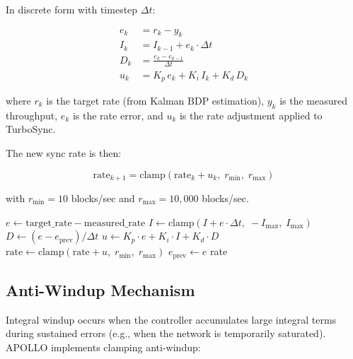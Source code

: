 \documentclass[11pt,a4paper]{article}
\begin{document}
In discrete form with timestep $\Delta t$:

\begin{align}
e_k &= r_k - y_k \label{eq:error} \\
I_k &= I_{k-1} + e_k \cdot \Delta t \label{eq:integral} \\
D_k &= \frac{e_k - e_{k-1}}{\Delta t} \label{eq:derivative} \\
u_k &= K_p \, e_k + K_i \, I_k + K_d \, D_k \label{eq:pid_discrete}
\end{align}

where $r_k$ is the target rate (from Kalman BDP estimation), $y_k$ is the measured throughput, $e_k$ is the rate error, and $u_k$ is the rate adjustment applied to TurboSync.

The new sync rate is then:

\begin{equation}
\text{rate}_{k+1} = \text{clamp}\!\left(\text{rate}_k + u_k,\; r_{\min},\; r_{\max}\right)
\label{eq:rate_update}
\end{equation}

with $r_{\min} = 10$ blocks/sec and $r_{\max} = 10{,}000$ blocks/sec.

\begin{algorithm}
\caption{PID Rate Controller: Update Step}
\label{alg:pid}
\begin{algorithmic}[1]
    \State $e \gets \text{target\_rate} - \text{measured\_rate}$
    \State $I \gets \text{clamp}(I + e \cdot \Delta t, \; -I_{\max}, \; I_{\max})$ 
    \State $D \gets (e - e_{\text{prev}}) / \Delta t$
    \State $u \gets K_p \cdot e + K_i \cdot I + K_d \cdot D$
    \State $\text{rate} \gets \text{clamp}(\text{rate} + u, \; r_{\min}, \; r_{\max})$
    \State $e_{\text{prev}} \gets e$
    \State {}
        \State {}
    \EndIf
    \State \Return rate
\EndProcedure
\end{algorithmic}
\end{algorithm}

\subsection{Anti-Windup Mechanism}

Integral windup occurs when the controller accumulates large integral terms during sustained errors (e.g., when the network is temporarily saturated). APOLLO implements clamping anti-windup:
\end{document}
